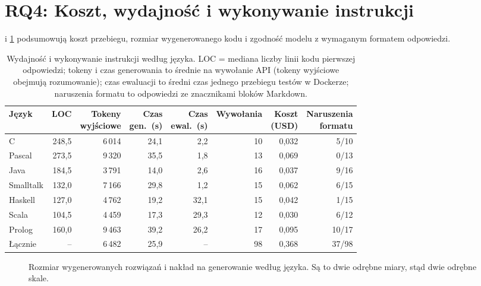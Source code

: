 \section{RQ4: Koszt, wydajność i wykonywanie instrukcji}
\label{sec:cost}

 i \cref{fig:size} podsumowują koszt przebiegu, rozmiar wygenerowanego kodu
i zgodność modelu z wymaganym formatem odpowiedzi.

\begin{table}[htbp]
  \centering
  \caption{Wydajność i wykonywanie instrukcji według języka. LOC = mediana liczby linii kodu
    pierwszej odpowiedzi; tokeny i czas generowania to średnie na wywołanie API (tokeny wyjściowe
    obejmują rozumowanie); czas ewaluacji to średni czas jednego przebiegu testów w Dockerze;
    naruszenia formatu to odpowiedzi ze znacznikami bloków Markdown.}
  \label{tab:efficiency}
  \small
  \begin{tabular}{@{}lrrrrrrr@{}}
    \toprule
    Język & LOC & \makecell[r]{Tokeny\\wyjściowe} & \makecell[r]{Czas\\gen.\ (s)} & \makecell[r]{Czas\\ewal.\ (s)} & Wywołania & \makecell[r]{Koszt\\(USD)} & \makecell[r]{Naruszenia\\formatu} \\
    \midrule
    C         & 248,5 & 6\,014 & 24,1 &  2,2 & 10 & 0,032 &  5/10 \\
    Pascal    & 273,5 & 9\,320 & 35,5 &  1,8 & 13 & 0,069 &  0/13 \\
    Java      & 184,5 & 3\,791 & 14,0 &  2,6 & 16 & 0,037 &  9/16 \\
    Smalltalk & 132,0 & 7\,166 & 29,8 &  1,2 & 15 & 0,062 &  6/15 \\
    Haskell   & 127,0 & 4\,762 & 19,2 & 32,1 & 15 & 0,042 &  1/15 \\
    Scala     & 104,5 & 4\,459 & 17,3 & 29,3 & 12 & 0,030 &  6/12 \\
    Prolog    & 160,0 & 9\,463 & 39,2 & 26,2 & 17 & 0,095 & 10/17 \\
    \midrule
    Łącznie   & --    & 6\,482 & 25,9 & --   & 98 & 0,368 & 37/98 \\
    \bottomrule
  \end{tabular}
\end{table}

\begin{figure}[htbp]
  \centering
  
  \caption{Rozmiar wygenerowanych rozwiązań i nakład na generowanie według języka. Są to dwie
    odrębne miary, stąd dwie odrębne skale.}
  \label{fig:size}
\end{figure}

